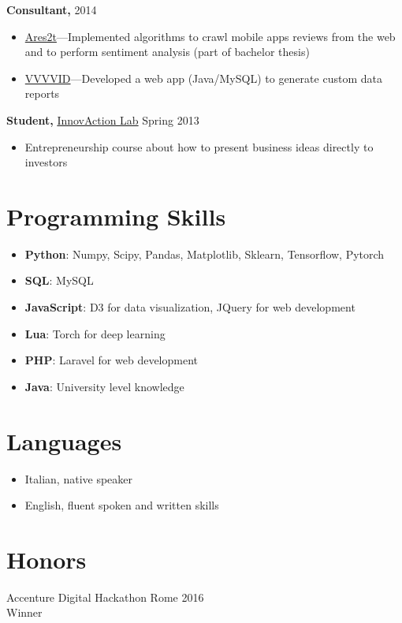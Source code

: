 \documentclass[margin]{res}
\begin{document}
\begin{resume}
    {\bf Consultant,} \hfill 2014
    \begin{itemize} \itemsep-2pt
        \item \href{http://www.ares2t.com/en/web/home.php}{Ares2t}---Implemented algorithms to crawl
            mobile apps reviews from the web and to perform sentiment analysis (part of bachelor thesis) 
        \item \href{https://www.vvvvid.it}{VVVVID}---Developed a web app (Java/MySQL) to generate custom
            data reports
    \end{itemize}

    {\bf Student,} \href{http://www.innovactionlab.org/?lang=en}{InnovAction Lab} \hfill Spring 2013
    \begin{itemize} \itemsep-2pt
        \item Entrepreneurship course about how to present business ideas directly to investors
    \end{itemize}
 
\section{Programming Skills}
\begin{itemize}
    \item \textbf{Python}: Numpy, Scipy, Pandas, Matplotlib, Sklearn, Tensorflow, Pytorch
    \item \textbf{SQL}: MySQL
    \item \textbf{JavaScript}: D3 for data visualization, JQuery for web development
    \item \textbf{Lua}: Torch for deep learning
    \item \textbf{PHP}: Laravel for web development
    \item \textbf{Java}: University level knowledge
\end{itemize}

\section{Languages}
\begin{itemize}
    \item Italian, native speaker
    \item English, fluent spoken and written skills
\end{itemize}

\section{Honors}
Accenture Digital Hackathon Rome \hfill 2016 \\
Winner 


\end{resume}
\end{document}
